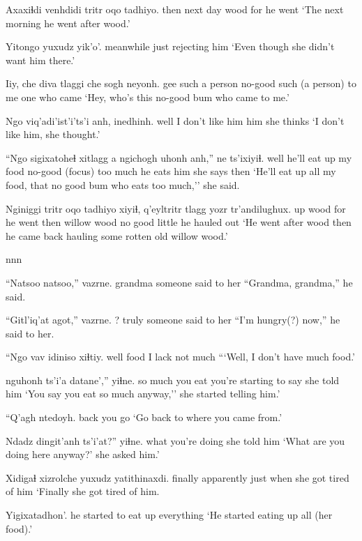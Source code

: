 \documentclass[12pt]{article}
\begin{document}
\gll Axaxiɬdi venhdidi tritr oqo tadhiyo.
then {next day} wood for {he went}
\glt `The next morning he went after wood.'
\glend

\gll Yitongo yuxudz yik'o'.
meanwhile just {rejecting him}
\glt `Even though she didn't want him there.'
\glend

\gll Iiy, {che diva} tlaggi che sogh neyonh.
gee {such a person} no-good {such (a person)} {to me} {one who came}
\glt `Hey, who's this no-good bum who came to me.'
\glend

\gll Ngo viq'adi'ist'i'ts'i anh, inedhinh.
well {I don't like him} him {she thinks}
\glt `I don't like him, she thought.'
\glend

\gll ``Ngo sigixatoheɬ xitlagg a ngichogh uhonh anh,'' ne ts'ixiyiɬ.
well {he'll eat up my food} no-good {(focus)} {too much} {he eats} him {she says} then
\glt `He'll eat up all my food, that no good bum who eats too much,'' she said.
\glend

\gll Nginiggi tritr oqo tadhiyo xiyiɬ, q'eyltritr tlagg yozr tr'andilughux.
up wood for {he went} then {willow wood} {no good} little {he hauled out}
\glt `He went after wood then he came back hauling some rotten old willow wood.'
\glend

nnn

\gll ``Natsoo natsoo,'' vazrne.
grandma {} {someone said to her}
\glt ``Grandma, grandma,'' he said.
\glend

\gll ``Gitl'iq'at agot,'' vazrne.
? truly {someone said to her}
\glt ``I'm hungry(?) now,'' he said to her.
\glend

\gll ``Ngo vav idiniso xiɬtiy.
well food {I lack} {not much}
\glt ```Well, I don't have much food.'
\glend

 nguhonh ts'i'a datane','' yiɬne.
{so much} {you eat} {} {you're starting to say} {she told him}
\glt `You say you eat so much anyway,'' she started telling him.'
\glend

\gll ``Q'agh ntedoyh. 
back {you go}	 
\glt `Go back to where you came from.'
\glend

\gll Ndadz dingit'anh ts'i'at?'' yiɬne.
what {you're doing} {} {she told him}
\glt `What are you doing here anyway?' she asked him.'
\glend

\gll Xidigaɬ xizrolche yuxudz yatithinaxdi. 
finally apparently just {when she got tired of him} 
\glt `Finally she got tired of him. 
\glend

\gll Yigixatadhon'.
{{he started to eat up everything}}
\glt  `He started eating up all (her food).'
\glend
\end{document}
